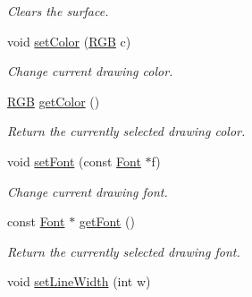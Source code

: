 \begin{DoxyCompactItemize}
\begin{DoxyCompactList}\small\item\em Clears the surface. \end{DoxyCompactList}\item 
void \hyperlink{classGUI_1_1Drawable_a320fc166762d1109f833a1381a8b8b81}{set\-Color} (\hyperlink{namespaceGUI_aeafd135255365f3584da0e982fc79466}{R\-G\-B} c)
\begin{DoxyCompactList}\small\item\em Change current drawing color. \end{DoxyCompactList}\item 
\hypertarget{classGUI_1_1Drawable_afd993dfb98455b33503f41685f7d8262}{\hyperlink{namespaceGUI_aeafd135255365f3584da0e982fc79466}{R\-G\-B} \hyperlink{classGUI_1_1Drawable_afd993dfb98455b33503f41685f7d8262}{get\-Color} ()}\label{classGUI_1_1Drawable_afd993dfb98455b33503f41685f7d8262}

\begin{DoxyCompactList}\small\item\em Return the currently selected drawing color. \end{DoxyCompactList}\item 
\hypertarget{classGUI_1_1Drawable_a2dd6cf02efccfccd3c3c4184be74a587}{void \hyperlink{classGUI_1_1Drawable_a2dd6cf02efccfccd3c3c4184be74a587}{set\-Font} (const \hyperlink{classGUI_1_1Font}{Font} $\ast$f)}\label{classGUI_1_1Drawable_a2dd6cf02efccfccd3c3c4184be74a587}

\begin{DoxyCompactList}\small\item\em Change current drawing font. \end{DoxyCompactList}\item 
\hypertarget{classGUI_1_1Drawable_a106eb9b6d8d1c5d0f3f92d3c5a6f6ced}{const \hyperlink{classGUI_1_1Font}{Font} $\ast$ \hyperlink{classGUI_1_1Drawable_a106eb9b6d8d1c5d0f3f92d3c5a6f6ced}{get\-Font} ()}\label{classGUI_1_1Drawable_a106eb9b6d8d1c5d0f3f92d3c5a6f6ced}

\begin{DoxyCompactList}\small\item\em Return the currently selected drawing font. \end{DoxyCompactList}\item 
\hypertarget{classGUI_1_1Drawable_a4fe8d528c5a5b0e7bf146d74a2d517e6}{void \hyperlink{classGUI_1_1Drawable_a4fe8d528c5a5b0e7bf146d74a2d517e6}{set\-Line\-Width} (int w)}\label{classGUI_1_1Drawable_a4fe8d528c5a5b0e7bf146d74a2d517e6}


\end{DoxyCompactItemize}
